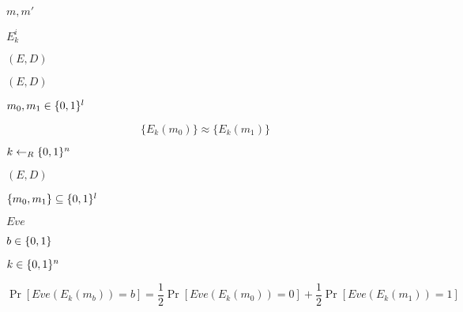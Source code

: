 \documentclass[10pt]{book}
\begin{document}
\begin{mdSnippets}
\begin{mdInlineSnippet}[67db24c9d6367e147ee325c66a0a5bac]%
$m,m'$\end{mdInlineSnippet}%
\begin{mdInlineSnippet}[8b204ff531f8a7d3f7d599ca2adc3430]%
$E^i_k$\end{mdInlineSnippet}%
\begin{mdInlineSnippet}[c150726dc018e82825c0c3617f46a1c9]%
$(E,D)$\end{mdInlineSnippet}%
\begin{mdInlineSnippet}[c150726dc018e82825c0c3617f46a1c9]%
$(E,D)$\end{mdInlineSnippet}%
\begin{mdInlineSnippet}[79813aa61163871708c094e8192a07e2]%
$m_0,m_1 \in \{0,1\}^l$\end{mdInlineSnippet}%
\begin{mdDisplaySnippet}[6390167cb241c835f315db97360a658e]%
\[%
\{E_k(m_0)\} \approx \{E_k(m_1)\}
\]%
\end{mdDisplaySnippet}%
\begin{mdInlineSnippet}[6933709c18472bddc33d71a676128586]%
$k \gets_R \{0,1\}^n$\end{mdInlineSnippet}%
\begin{mdInlineSnippet}[c150726dc018e82825c0c3617f46a1c9]%
$(E,D)$\end{mdInlineSnippet}%
\begin{mdInlineSnippet}[ca5745101ffc39bc290c6ec38b23c73e]%
$\{m_0, m_1\} \subseteq \{0,1\}^l$\end{mdInlineSnippet}%
\begin{mdInlineSnippet}%
$Eve$\end{mdInlineSnippet}%
\begin{mdInlineSnippet}[6892f7e7c3b8ecc19e4a077e82515567]%
$b \in \{0,1\}$\end{mdInlineSnippet}%
\begin{mdInlineSnippet}%
$k \in \{0,1\}^n$\end{mdInlineSnippet}%
\begin{mdDisplaySnippet}[6f4b49248009c26ffb673a2827b1df2c]%
\[%
\Pr[Eve(E_k(m_b)) = b] = \frac{1}{2}\Pr[Eve(E_k(m_0)) = 0] + \frac{1}{2}\Pr[Eve(E_k(m_1)) = 1]
\]
\end{mdDisplaySnippet}
\end{mdSnippets}
\end{document}
